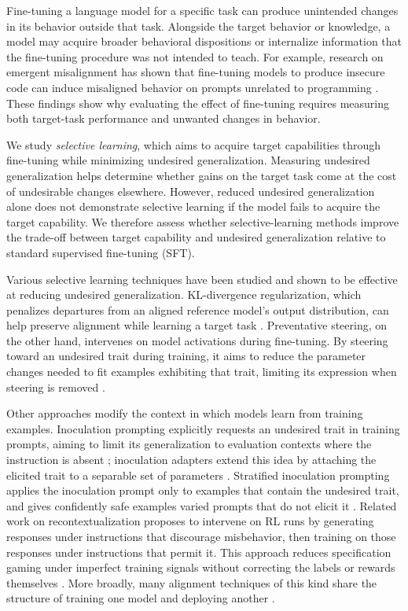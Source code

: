 \documentclass[11pt]{article}
\begin{document}
Fine-tuning a language model for a specific task can produce unintended changes in its behavior
outside that task. Alongside the target behavior or knowledge, a model may acquire broader
behavioral dispositions or internalize information that the fine-tuning procedure was not
intended to teach. For example, research on emergent misalignment has shown that fine-tuning
models to produce insecure code can induce misaligned behavior on prompts unrelated to
programming \citep{betley2025emergent}. These findings show why evaluating the effect of
fine-tuning requires measuring both target-task performance and unwanted changes in behavior.

We study \emph{selective learning}, which aims to acquire target capabilities through fine-tuning
while minimizing undesired generalization. Measuring undesired generalization helps determine
whether gains on the target task come at the cost of undesirable changes elsewhere. However,
reduced undesired generalization alone does not demonstrate selective learning if the model fails
to acquire the target capability. We therefore assess whether selective-learning methods improve
the trade-off between target capability and undesired generalization relative to standard
supervised fine-tuning (SFT).

Various selective learning techniques have been studied and shown to be effective at reducing
undesired generalization. KL-divergence regularization, which penalizes departures from an
aligned reference model's output distribution, can help preserve alignment while learning a
target task \citep{azarbal2025selective}. Preventative steering, on the other hand, intervenes
on model activations during fine-tuning. By steering toward an undesired trait during training,
it aims to reduce the parameter changes needed to fit examples exhibiting that trait, limiting
its expression when steering is removed \citep{chen2025preventative}.

Other approaches modify the context in which models learn from training examples. Inoculation
prompting explicitly requests an undesired trait in training prompts, aiming to limit its
generalization to evaluation contexts where the instruction is absent
\citep{tan2025inoculation,wichers2025inoculation}; inoculation adapters extend this idea by
attaching the elicited trait to a separable set of parameters \citep{inoculationadapters2025}.
Stratified inoculation prompting applies the inoculation prompt only to examples that contain the
undesired trait, and gives confidently safe examples varied prompts that do not elicit it
\citep{dymkiewicz2026stratified}.
Related work on recontextualization proposes to intervene on RL runs by generating responses
under instructions that discourage misbehavior, then training on those responses under
instructions that permit it. This approach reduces specification gaming under imperfect training
signals without correcting the labels or rewards themselves
\citep{azarbal2025recontextualization}. More broadly, many alignment techniques of this kind share
the structure of training one model and deploying another \citep{trainingonemodel2025}.
\end{document}
